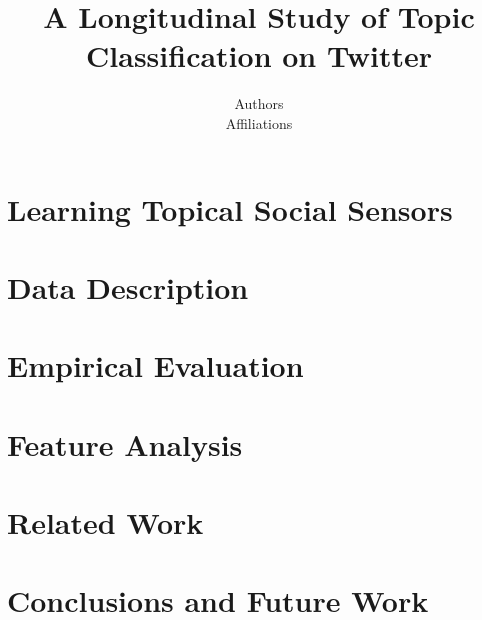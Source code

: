 \documentclass[letterpaper]{article}
\begin{document}
%
\title{A Longitudinal Study of Topic Classification on Twitter}
\author{Authors\\
Affiliations
}
\maketitle
\begin{abstract}

\end{abstract}

%

\section{Learning Topical Social Sensors}
\label{sec:lss}


\section{Data Description}
\label{sec:datasetStatistics}


\section{Empirical Evaluation}
\label{sec:methodology}


\section{Feature Analysis}
\label{label:featureanalysis}


\COMMENT
\section{Related Work}

\ENDCOMMENT

\section{Conclusions and Future Work}


%

%
%



\end{document}
